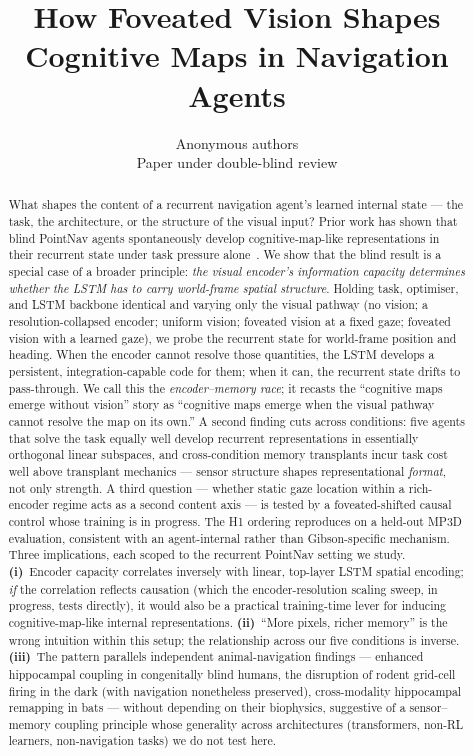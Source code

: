\documentclass{article}
\title{How Foveated Vision Shapes Cognitive Maps in Navigation Agents}
\author{%
  Anonymous authors\\
  Paper under double-blind review\\
}
\begin{document}
\maketitle

\begin{abstract}
What shapes the content of a recurrent navigation agent's learned internal state --- the task, the architecture, or the structure of the visual input? Prior work has shown that blind PointNav agents spontaneously develop cognitive-map-like representations in their recurrent state under task pressure alone~\citep{wijmans2023emergence}. We show that the blind result is a special case of a broader principle: \emph{the visual encoder's information capacity determines whether the LSTM has to carry world-frame spatial structure}. Holding task, optimiser, and LSTM backbone identical and varying only the visual pathway (no vision; a resolution-collapsed encoder; uniform vision; foveated vision at a fixed gaze; foveated vision with a learned gaze), we probe the recurrent state for world-frame position and heading. When the encoder cannot resolve those quantities, the LSTM develops a persistent, integration-capable code for them; when it can, the recurrent state drifts to pass-through. We call this the \emph{encoder--memory race}; it recasts the ``cognitive maps emerge without vision'' story as ``cognitive maps emerge when the visual pathway cannot resolve the map on its own.'' A second finding cuts across conditions: five agents that solve the task equally well develop recurrent representations in essentially orthogonal linear subspaces, and cross-condition memory transplants incur task cost well above transplant mechanics --- sensor structure shapes representational \emph{format}, not only strength. A third question --- whether static gaze location within a rich-encoder regime acts as a second content axis --- is tested by a foveated-shifted causal control whose training is in progress. The H1 ordering reproduces on a held-out MP3D evaluation, consistent with an agent-internal rather than Gibson-specific mechanism. Three implications, each scoped to the recurrent PointNav setting we study. \textbf{(i)}~Encoder capacity correlates inversely with linear, top-layer LSTM spatial encoding; \emph{if} the correlation reflects causation (which the encoder-resolution scaling sweep, in progress, tests directly), it would also be a practical training-time lever for inducing cognitive-map-like internal representations. \textbf{(ii)}~``More pixels, richer memory'' is the wrong intuition within this setup; the relationship across our five conditions is inverse. \textbf{(iii)}~The pattern parallels independent animal-navigation findings --- enhanced hippocampal coupling in congenitally blind humans, the disruption of rodent grid-cell firing in the dark (with navigation nonetheless preserved), cross-modality hippocampal remapping in bats --- without depending on their biophysics, suggestive of a sensor--memory coupling principle whose generality across architectures (transformers, non-RL learners, non-navigation tasks) we do not test here.
\end{abstract}
\end{document}
